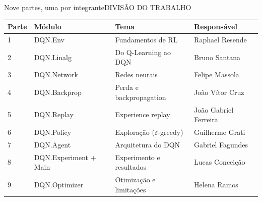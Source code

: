 \documentclass[aspectratio=169,10pt]{beamer}
\newcommand{\cab}[1]{\leavevmode\textcolor{cinza}{\scriptsize #1}}
\begin{document}
\begin{frame}{Nove partes, uma por integrante}{DIVISÃO DO TRABALHO}
  \footnotesize
  \renewcommand{\arraystretch}{1.12}
  \begin{tabularx}{\textwidth}{@{}l>{\ttfamily}lXX@{}}
    \toprule
    \cab{Parte} & \cab{\normalfont Módulo} & \cab{Tema} & \cab{Responsável}\\
    \midrule
    1 & DQN.Env               & Fundamentos de RL        & Raphael Resende\\
    2 & DQN.Linalg            & Do Q-Learning ao DQN     & Bruno Santana\\
    3 & DQN.Network           & Redes neurais            & Felipe Massola\\
    4 & DQN.Backprop          & Perda e backpropagation  & João Vítor Cruz\\
    5 & DQN.Replay            & Experience replay        & João Gabriel Ferreira\\
    6 & DQN.Policy            & Exploração ($\varepsilon$-greedy) & Guilherme Grati\\
    7 & DQN.Agent             & Arquitetura do DQN       & Gabriel Fagundes\\
    8 & DQN.Experiment + Main & Experimento e resultados & Lucas Conceição\\
    9 & DQN.Optimizer         & Otimização e limitações  & Helena Ramos\\
    \bottomrule
  \end{tabularx}
\end{frame}
\end{document}
